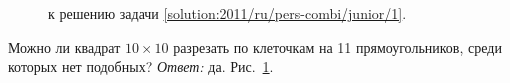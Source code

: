 \ifsolution
\begin{figure}\centering
    \caption{к решению задачи \ref{solution:2011/ru/pers-combi/junior/1}.}
    \label{fig:solution:2011/ru/pers-combi/junior/1}
\end{figure}%
\fi %

\problem
Можно ли квадрат $10 \times 10$ разрезать по клеточкам на 11 прямоугольников,
среди которых нет подобных?
\solution
\label{solution:2011/ru/pers-combi/junior/1}%
\emph{Ответ:} да.
Рис.~\ref{fig:solution:2011/ru/pers-combi/junior/1}.
\endproblem
